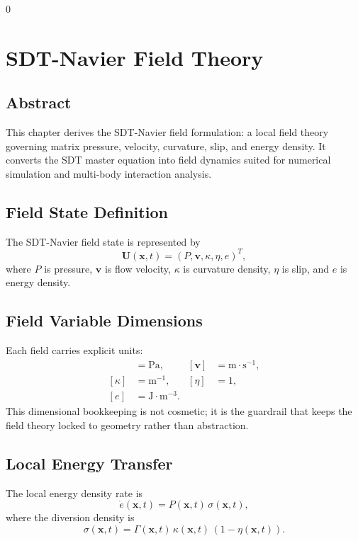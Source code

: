0\documentclass[12pt]{book}
\begin{document}
\chapter{SDT-Navier Field Theory}

\section*{Abstract}
This chapter derives the SDT-Navier field formulation: a local field theory governing matrix pressure,
velocity, curvature, slip, and energy density. It converts the SDT master equation into field dynamics
suited for numerical simulation and multi-body interaction analysis.

\section{Field State Definition}
The SDT-Navier field state is represented by
\begin{equation}
\mathbf{U}(\mathbf{x},t) = \left(P, \mathbf{v}, \kappa, \eta, e\right)^T,
\end{equation}
where $P$ is pressure, $\mathbf{v}$ is flow velocity, $\kappa$ is curvature density, $\eta$ is slip,
and $e$ is energy density.

\section{Field Variable Dimensions}
Each field carries explicit units:
\begin{align}
[P] &= \text{Pa}, &
[\mathbf{v}] &= \text{m}\cdot\text{s}^{-1}, \\
[\kappa] &= \text{m}^{-1}, &
[\eta] &= 1, \\
[e] &= \text{J}\cdot\text{m}^{-3}. &
\end{align}
This dimensional bookkeeping is not cosmetic; it is the guardrail that keeps the field theory locked to
geometry rather than abstraction.

\section{Local Energy Transfer}
The local energy density rate is
\begin{equation}
\dot{e}(\mathbf{x},t) = P(\mathbf{x},t)\,\sigma(\mathbf{x},t),
\end{equation}
where the diversion density is
\begin{equation}
\sigma(\mathbf{x},t) = \Gamma(\mathbf{x},t)\,\kappa(\mathbf{x},t)\,(1-\eta(\mathbf{x},t)).
\end{equation}
\end{document}
